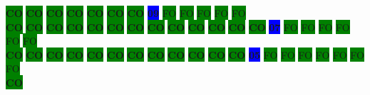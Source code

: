 \colorbox{green}{\color[rgb]{0,0,0}\textbf{CO}}%
\colorbox{green}{\color[rgb]{0,0,0}\textbf{CO}}%
\colorbox{green}{\color[rgb]{0,0,0}\textbf{CO}}%
\colorbox{green}{\color[rgb]{0,0,0}\textbf{CO}}%
\colorbox{green}{\color[rgb]{0,0,0}\textbf{CO}}%
\colorbox{green}{\color[rgb]{0,0,0}\textbf{CO}}%
\colorbox{green}{\color[rgb]{0,0,0}\textbf{CO}}%
\colorbox{blue}{\color[rgb]{1,0,0}\textbf{09}}%
\colorbox{green}{\color[gray]{0.75}FO}%
\colorbox{green}{\color[gray]{0.75}FO}%
\colorbox{green}{\color[gray]{0.75}FO}%
\colorbox{green}{\color[gray]{0.75}FO}%
\colorbox{green}{\color[gray]{0.75}FO}%
\\
\colorbox{green}{\color[rgb]{0,0,0}\textbf{CO}}%
\colorbox{green}{\color[rgb]{0,0,0}\textbf{CO}}%
\colorbox{green}{\color[rgb]{0,0,0}\textbf{CO}}%
\colorbox{green}{\color[rgb]{0,0,0}\textbf{CO}}%
\colorbox{green}{\color[rgb]{0,0,0}\textbf{CO}}%
\colorbox{green}{\color[rgb]{0,0,0}\textbf{CO}}%
\colorbox{green}{\color[rgb]{0,0,0}\textbf{CO}}%
\colorbox{green}{\color[rgb]{0,0,0}\textbf{CO}}%
\colorbox{green}{\color[rgb]{0,0,0}\textbf{CO}}%
\colorbox{green}{\color[rgb]{0,0,0}\textbf{CO}}%
\colorbox{green}{\color[rgb]{0,0,0}\textbf{CO}}%
\colorbox{green}{\color[rgb]{0,0,0}\textbf{CO}}%
\colorbox{green}{\color[rgb]{0,0,0}\textbf{CO}}%
\colorbox{blue}{\color[rgb]{1,0,0}\textbf{07}}%
\colorbox{green}{\color[gray]{0.75}FO}%
\colorbox{green}{\color[gray]{0.75}FO}%
\colorbox{green}{\color[gray]{0.75}FO}%
\colorbox{green}{\color[gray]{0.75}FO}%
\colorbox{green}{\color[gray]{0.75}FO}%
\colorbox{green}{\color[gray]{0.75}FO}%
\\
\colorbox{green}{\color[rgb]{0,0,0}\textbf{CO}}%
\colorbox{green}{\color[rgb]{0,0,0}\textbf{CO}}%
\colorbox{green}{\color[rgb]{0,0,0}\textbf{CO}}%
\colorbox{green}{\color[rgb]{0,0,0}\textbf{CO}}%
\colorbox{green}{\color[rgb]{0,0,0}\textbf{CO}}%
\colorbox{green}{\color[rgb]{0,0,0}\textbf{CO}}%
\colorbox{green}{\color[rgb]{0,0,0}\textbf{CO}}%
\colorbox{green}{\color[rgb]{0,0,0}\textbf{CO}}%
\colorbox{green}{\color[rgb]{0,0,0}\textbf{CO}}%
\colorbox{green}{\color[rgb]{0,0,0}\textbf{CO}}%
\colorbox{green}{\color[rgb]{0,0,0}\textbf{CO}}%
\colorbox{green}{\color[rgb]{0,0,0}\textbf{CO}}%
\colorbox{blue}{\color[rgb]{1,0,0}\textbf{05}}%
\colorbox{green}{\color[gray]{0.75}FO}%
\colorbox{green}{\color[gray]{0.75}FO}%
\colorbox{green}{\color[gray]{0.75}FO}%
\colorbox{green}{\color[gray]{0.75}FO}%
\colorbox{green}{\color[gray]{0.75}FO}%
\colorbox{green}{\color[gray]{0.75}FO}%
\colorbox{green}{\color[gray]{0.75}FO}%
\\
\colorbox{green}{\color[rgb]{0,0,0}\textbf{CO}}%
